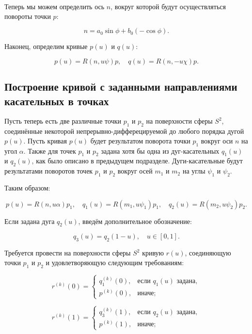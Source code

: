 Теперь мы можем определить ось $n$, вокруг которой будут осуществляться повороты точки $p$:

\begin{equation}
n=a_0\sin\phi+b_0(-\cos\phi).
\label{two-dimension-tangent-axis-3}
\end{equation}

Наконец, определим кривые $p(u)$ и $q(u)$:

$$
p(u)=R(n,u\psi)p, \quad q(u)=R(n,-u\chi)p.
$$

\subsection*{Построение кривой с заданными направлениями \mbox{касательных} в точках}

Пусть теперь есть две различные точки $p_1$ и $p_2$ на поверхности сферы $S^2$, соединённые некоторой
непрерывно-дифферецируемой до любого порядка дугой $p(u)$. Пусть кривая $p(u)$ будет результатом поворота точки $p_1$
вокруг оси $n$ на угол $\alpha$. Также для точек $p_1$ и $p_2$ задана хотя бы одна из дуг-касательных $q_1(u)$
и $q_2(u)$, как было описано в предыдущем подразделе. Дуги-касательные будут результатами поворотов точек $p_1$ и $p_2$
вокруг осей $m_1$ и $m_2$ на углы $\psi_1$ и $\psi_2$.

Таким образом:

$$
p(u)=R(n,u\alpha)p_1, \quad q_1(u)=R(m_1,u\psi_1)p_1, \quad q_2(u)=R(m_2,u\psi_2)p_2.
$$

Если задана дуга $q_2(u)$, введём дополнительное обозначение:

$$
q_3(u)=q_2(1-u), \quad u \in [0,1].
$$

Требуется провести на поверхности сферы $S^2$ кривую $r(u)$, соединяющую точки $p_1$ и $p_2$ и удовлетворяющую
следующим требованиям:

\begin{equation*}
r^{(k)}(0)=
  \begin{cases}
    q_1^{(k)}(0), & \text{если $q_1(u)$ задана}, \\
    p^{(k)}(0),   & \text{иначе};
  \end{cases}
\end{equation*}

\begin{equation*}
r^{(k)}(1)=
  \begin{cases}
    q_3^{(k)}(1), & \text{если $q_2(u)$ задана}, \\
    p^{(k)}(1),   & \text{иначе};
  \end{cases}
\end{equation*}

